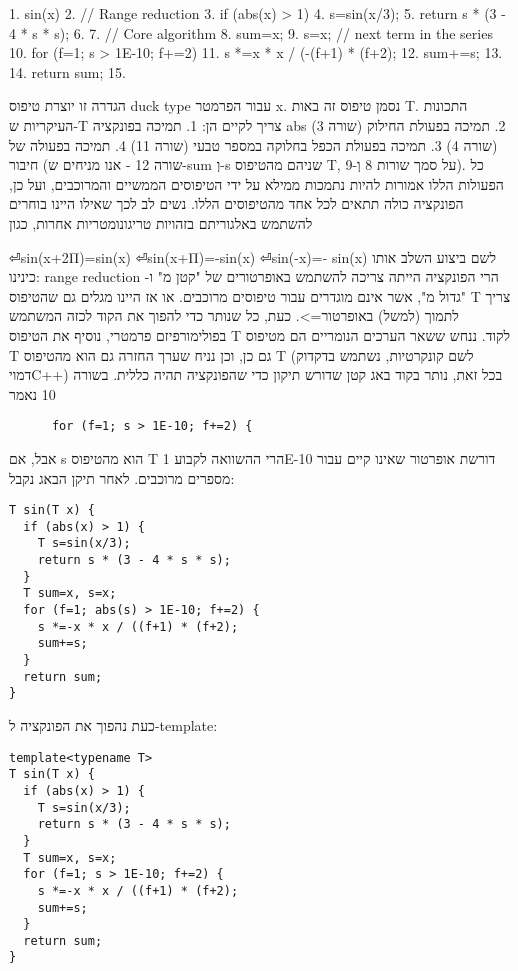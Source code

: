       1. sin(x) {
        2. // Range reduction
        3. if (abs(x) > 1) {
          4. s=sin(x/3);
          5. return s * (3 - 4 * s * s);
        6. }
        7. // Core algorithm
        8. sum=x;
        9. s=x; // next term in the series
        10. for (f=1; s > 1E-10; f+=2) {
          11. s *=x * x / (-(f+1) * (f+2);
          12. sum+=s;
        13. }
        14. return sum;
      15. }

      הגדרה זו יוצרת טיפוס duck type עבור הפרמטר x. נסמן טיפוס זה באות T. התכונות העיקריות ש-T צריך לקיים הן:
      1. תמיכה בפונקציה abs (שורה 3)
      2. תמיכה בפעולת החילוק (שורה 4)
      3. תמיכה בפעולת הכפל בחלוקה במספר טבעי (שורה 11)
      4. תמיכה בפעולה של חיבור (שורה 12 - אנו מניחים ש-sum וְ-s שניהם מהטיפוס T, על סמך שורות 8 וְ-9).
      כל הפעולות הללו אמורות להיות נתמכות ממילא על ידי הטיפוסים הממשיים והמרוכבים, ועל כן, הפונקציה כולה תתאים לכל אחד מהטיפוסים הללו.
      נשים לב לכך שאילו היינו בוחרים להשתמש באלגוריתם בזהויות טריגונומטריות אחרות, כגון
      \begin{ציינון}
⏎sin(x+2Π)=sin(x)
⏎sin(x+Π)=-sin(x)
⏎sin(-x)=- sin(x)
      לשם ביצוע השלב אותו כינינו: range reduction הרי הפונקציה הייתה צריכה להשתמש באופרטורים של "קטן מ" ו- "גדול מ", אשר אינם מוגדרים עבור טיפוסים מרוכבים. או אז היינו מגלים גם שהטיפוס T צריך לתמוך (למשל) באופרטור=>.
      כעת, כל שנותר כדי להפוך את הקוד לכזה המשתמש בפולימורפיזם פרמטרי, נוסיף את הטיפוס T לקוד. ננחש ששאר הערכים הנומריים הם מטיפוס T גם כן, וכן נניח שערך החזרה גם הוא מהטיפוס T (לשם קונקרטיות, נשתמש בדקדוק דמויC++)
      בכל זאת, נותר בקוד באג קטן שדורש תיקון כדי שהפונקציה תהיה כללית. בשורה 10 נאמר
\begin{verbatim}
      for (f=1; s > 1E-10; f+=2) {
\end{verbatim}
        אבל, אם s הוא מהטיפוס T הרי ההשוואה לקבוע 1E-10 דורשת אופרטור שאינו קיים עבור מספרים מרוכבים. לאחר תיקן הבאג נקבל:
    \end{ציינון}

\begin{verbatim}
T sin(T x) {
  if (abs(x) > 1) {
    T s=sin(x/3);
    return s * (3 - 4 * s * s);
  }
  T sum=x, s=x;
  for (f=1; abs(s) > 1E-10; f+=2) {
    s *=-x * x / ((f+1) * (f+2);
    sum+=s;
  }
  return sum;
}
\end{verbatim}

        כעת נהפוך את הפונקציה ל-template:

\begin{verbatim}
template<typename T>
T sin(T x) {
  if (abs(x) > 1) {
    T s=sin(x/3);
    return s * (3 - 4 * s * s);
  }
  T sum=x, s=x;
  for (f=1; s > 1E-10; f+=2) {
    s *=-x * x / ((f+1) * (f+2);
    sum+=s;
  }
  return sum;
}
\end{verbatim}

